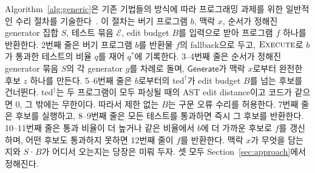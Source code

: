 \documentclass[10pt,conference]{IEEEtran}
\begin{document}
Algorithm~\ref{alg:generic}은 기존 기법들의 방식에 따라 프로그래밍 과제를 위한 일반적인 수리 절차를 기술한다~\cite{gulwani2018automated,wang2018search,hu2019re}. 이 절차는 버기 프로그램 \(b\), 맥락 \(x\), 순서가 정해진 generator 집합 \(S\), 테스트 묶음 \(\mathcal E\), edit budget \(B\)를 입력으로 받아 프로그램 \(f\) 하나를 반환한다. 2번째 줄은 버기 프로그램 \(b\)를 반환물 \(f\)의 fallback으로 두고, \(\textsc{Execute}\)로 \(b\)가 통과한 테스트의 비율 \(q\)를 재어 \(q^*\)에 기록한다. 3--4번째 줄은 순서가 정해진 generator 묶음 \(S\)의 각 generator \(g\)를 차례로 돌며, \(\mathsf{Generate}\)가 맥락 \(x\)로부터 완전한 후보 \(z\) 하나를 만든다. 5--6번째 줄은 \(b\)로부터의 \(\mathrm{ted}^{\dagger}\)가 edit budget \(B\)를 넘는 후보를 건너뛴다. \(\mathrm{ted}^{\dagger}\)는 두 프로그램이 모두 파싱될 때의 AST edit distance이고 코드가 같으면 0, 그 밖에는 무한이다. 따라서 제한 없는 \(B\)는 구문 오류 수리를 허용한다. 7번째 줄은 후보를 실행하고, 8--9번째 줄은 모든 테스트를 통과하면 즉시 그 후보를 반환한다. 10--11번째 줄은 통과 비율이 더 높거나 같은 비율에서 \(b\)에 더 가까운 후보로 \(f\)를 갱신하며, 어떤 후보도 통과하지 못하면 12번째 줄이 \(f\)를 반환한다. 맥락 \(x\)가 무엇을 담는지와 \(S\)·\(B\)가 어디서 오는지는 당장은 미뤄 두자. 셋 모두 Section~\ref{sec:approach}에서 정해진다.
\end{document}

